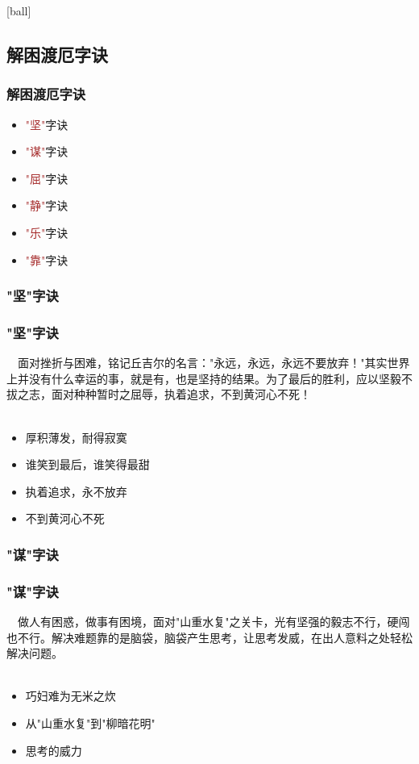 [ball]

\subsection{解困渡厄字诀}
\begin{frame}
\frametitle{解困渡厄字诀}
\begin{itemize}
    \item \textcolor{brown}{"坚"}字诀
    \item \textcolor{brown}{"谋"}字诀
    \item \textcolor{brown}{"屈"}字诀
    \item \textcolor{brown}{"静"}字诀
    \item \textcolor{brown}{"乐"}字诀
    \item \textcolor{brown}{"靠"}字诀
\end{itemize}
\end{frame}


\subsubsection{"坚"字诀}
\begin{frame}
\frametitle{"坚"字诀}
\noindent\handr~~面对挫折与困难，铭记丘吉尔的名言："永远，永远，永远不要放弃！"其实世界上并没有什么幸运的事，就是有，也是坚持的结果。为了最后的胜利，应以坚毅不拔之志，面对种种暂时之屈辱，执着追求，不到黄河心不死！
~\\
~\\
\begin{itemize}
    \item 厚积薄发，耐得寂寞
    \item 谁笑到最后，谁笑得最甜
    \item 执着追求，永不放弃
    \item 不到黄河心不死
\end{itemize}
\end{frame}

\subsubsection{"谋"字诀}
\begin{frame}
\frametitle{"谋"字诀}
\noindent\handr~~做人有困惑，做事有困境，面对"山重水复"之关卡，光有坚强的毅志不行，硬闯也不行。解决难题靠的是脑袋，脑袋产生思考，让思考发威，在出人意料之处轻松解决问题。
~\\
~\\
\begin{itemize}
    \item 巧妇难为无米之炊
    \item 从"山重水复"到"柳暗花明"
    \item 思考的威力
\end{itemize}
\end{frame}

